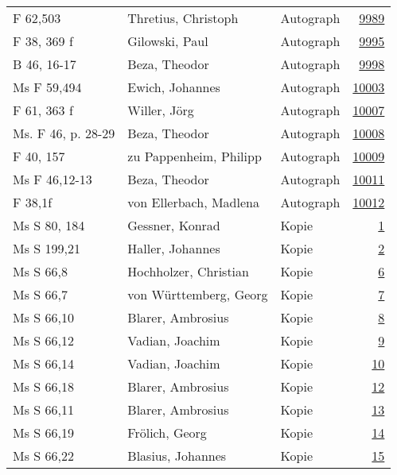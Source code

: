 \documentclass[10pt,a4paper,landscape]{report}
\begin{document}
\begin{longtable}{p{16cm}p{4cm}lr}
F 62,503	&	Thretius, Christoph	&	Autograph	&	\href{http://130.60.24.72/assignment/9989}{9989}\\
F 38, 369 f	&	Gilowski, Paul	&	Autograph	&	\href{http://130.60.24.72/assignment/9995}{9995}\\
B 46, 16-17	&	Beza, Theodor	&	Autograph	&	\href{http://130.60.24.72/assignment/9998}{9998}\\
Ms F 59,494	&	Ewich, Johannes	&	Autograph	&	\href{http://130.60.24.72/assignment/10003}{10003}\\
F 61, 363 f	&	Willer, Jörg	&	Autograph	&	\href{http://130.60.24.72/assignment/10007}{10007}\\
Ms. F 46, p. 28-29	&	Beza, Theodor	&	Autograph	&	\href{http://130.60.24.72/assignment/10008}{10008}\\
F 40, 157	&	zu Pappenheim, Philipp	&	Autograph	&	\href{http://130.60.24.72/assignment/10009}{10009}\\
Ms F 46,12-13	&	Beza, Theodor	&	Autograph	&	\href{http://130.60.24.72/assignment/10011}{10011}\\
F 38,1f	&	von Ellerbach, Madlena	&	Autograph	&	\href{http://130.60.24.72/assignment/10012}{10012}\\
Ms S 80, 184	&	Gessner, Konrad	&	Kopie	&	\href{http://130.60.24.72/assignment/1}{1}\\
Ms S 199,21	&	Haller, Johannes	&	Kopie	&	\href{http://130.60.24.72/assignment/2}{2}\\
Ms S 66,8	&	Hochholzer, Christian	&	Kopie	&	\href{http://130.60.24.72/assignment/6}{6}\\
Ms S 66,7	&	von Württemberg, Georg	&	Kopie	&	\href{http://130.60.24.72/assignment/7}{7}\\
Ms S 66,10	&	Blarer, Ambrosius	&	Kopie	&	\href{http://130.60.24.72/assignment/8}{8}\\
Ms S 66,12	&	Vadian, Joachim	&	Kopie	&	\href{http://130.60.24.72/assignment/9}{9}\\
Ms S 66,14	&	Vadian, Joachim	&	Kopie	&	\href{http://130.60.24.72/assignment/10}{10}\\
Ms S 66,18	&	Blarer, Ambrosius	&	Kopie	&	\href{http://130.60.24.72/assignment/12}{12}\\
Ms S 66,11	&	Blarer, Ambrosius	&	Kopie	&	\href{http://130.60.24.72/assignment/13}{13}\\
Ms S 66,19	&	Frölich, Georg	&	Kopie	&	\href{http://130.60.24.72/assignment/14}{14}\\
Ms S 66,22	&	Blasius, Johannes	&	Kopie	&	\href{http://130.60.24.72/assignment/15}{15}\\

\end{longtable}
\end{document}
